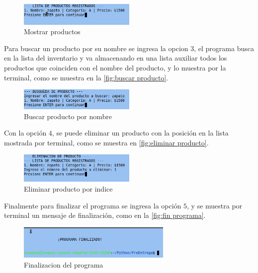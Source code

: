 \documentclass[12pt]{article}
\begin{document}
\begin{figure}[H]
	\centering
	\setlength{\fboxrule}{0pt}
	\includegraphics[width=0.5\textwidth]{Imagenes/img3.png}
	\caption{Mostrar productos}
	\label{fig:mostrar productos}
\end{figure} 

Para buscar un producto por su nombre se ingresa la opcion $3$, el programa busca en la lista del inventario y va almacenando en una lista auxiliar todos los productos que coinciden con el nombre del producto, y lo muestra por la terminal, como se muestra en la \autoref{fig:buscar producto}.

\begin{figure}[H]
	\centering
	\setlength{\fboxrule}{0pt}
	\includegraphics[width=0.5\textwidth]{Imagenes/img4.png}
	\caption{Buscar producto por nombre}
	\label{fig:buscar producto}
\end{figure} 

Con la opción $4$, se puede eliminar un producto con la posición en la lista mostrada por terminal, como se muestra en \autoref{fig:eliminar producto}.

\begin{figure}[H]
	\centering
	\setlength{\fboxrule}{0pt}
	\includegraphics[width=0.5\textwidth]{Imagenes/img5.png}
	\caption{Eliminar producto por indice}
	\label{fig:eliminar producto}
\end{figure} 

Finalmente para finalizar el programa se ingresa la opción $5$, y se muestra por terminal un mensaje de finalización, como en la \autoref{fig:fin programa}.
\begin{figure}[H]
	\centering
	\setlength{\fboxrule}{0pt}
	\includegraphics[width=0.66\textwidth]{Imagenes/img6.png}
	\caption{Finalizacion del programa}
	\label{fig:fin programa}
\end{figure} 
\end{document}
